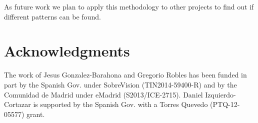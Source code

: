 \documentclass{sig-alternate-05-2015}
\begin{document}
As future work we plan to apply this methodology to other projects to find
out if different patterns can be found.

\section*{Acknowledgments}

The work of Jesus Gonzalez-Barahona and Gregorio Robles has been funded in part by the Spanish Gov. under SobreVision (TIN2014-59400-R) and by the Comunidad de Madrid under eMadrid (S2013/ICE-2715). Daniel Izquierdo-Cortazar is supported by the Spanish Gov. with a Torres Quevedo (PTQ-12-05577) grant.



%

%
%
\end{document}
